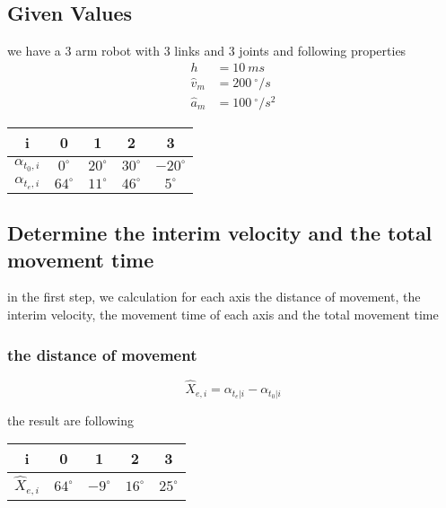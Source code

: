 \documentclass[%
  professionalfonts,%
  xcolor={%
    usenames,%
    dvipsnames,%
    svgnames,%
    table,%
    hyperref%
  }%
]{beamer}
\begin{document}
\subsection{Given Values }
\begin{frame}
we have a 3 arm robot with 3 links and 3 joints and following properties\\

\begin{align*}
h & = 10 ~ms \\
\hat{v}_{m} & = 200 ~^\circ/s \\
\hat{a}_{m} & = 100 ~^\circ/s^2
\end{align*}

\begin{center}
\begin{tabular}{ccccc}
\toprule
i & 0 & 1 & 2 & 3 \\
\midrule
$\alpha_{t_{0},i}$ & $  0^\circ$ & $20^\circ$ & $30^\circ$ & $-20^\circ$ \\ 
$\alpha_{t_{e},i}$ & $ 64^\circ$ & $11^\circ$ & $46^\circ$ & $  5^\circ$ \\
\bottomrule
\end{tabular}
\end{center}
\end{frame}

\subsection{Determine the interim velocity and the total movement time}
\begin{frame}
in the first step, we calculation for each axis the distance of movement, the interim velocity, the movement time of each axis and the total movement time

\subsubsection*{the distance of movement }
\begin{equation*}
\hat{X}_{e,i} = {\alpha_{t_{e}|i} - \alpha_{t_{0}|i}}
\end{equation*}

the result are following    
\begin{center}
\begin{tabular}{ccccc}
\toprule
i & 0 & 1 & 2 & 3 \\
\midrule
$\hat{X}_{e,i}$ & $ 64^\circ$ & $ -9^\circ$ & $16^\circ$ & $25^\circ$ \\
\bottomrule 
\end{tabular}
\end{center}
\end{frame}
\end{document}
